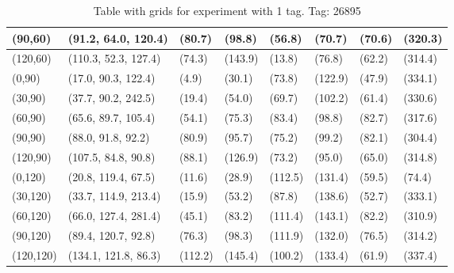 \begin{table}[H]
\begin{tabular}{|l|l|l|l|l|l|l|l|}
    (90,60) 	& (91.2, 64.0, 120.4) 	 & (80.7) 	& (98.8)	& (56.8)	 & (70.7) 	 & (70.6)	 & (320.3)	\\ \hline
    (120,60) 	& (110.3, 52.3, 127.4) 	 & (74.3) 	& (143.9)	& (13.8)	 & (76.8) 	 & (62.2)	 & (314.4)	\\ \hline
    (0,90) 	& (17.0, 90.3, 122.4) 	 & (4.9) 	& (30.1)	& (73.8)	 & (122.9) 	 & (47.9)	 & (334.1)	\\ \hline
    (30,90) 	& (37.7, 90.2, 242.5) 	 & (19.4) 	& (54.0)	& (69.7)	 & (102.2) 	 & (61.4)	 & (330.6)	\\ \hline
    (60,90) 	& (65.6, 89.7, 105.4) 	 & (54.1) 	& (75.3)	& (83.4)	 & (98.8) 	 & (82.7)	 & (317.6)	\\ \hline
    (90,90) 	& (88.0, 91.8, 92.2) 	 & (80.9) 	& (95.7)	& (75.2)	 & (99.2) 	 & (82.1)	 & (304.4)	\\ \hline
    (120,90) 	& (107.5, 84.8, 90.8) 	 & (88.1) 	& (126.9)	& (73.2)	 & (95.0) 	 & (65.0)	 & (314.8)	\\ \hline
    (0,120) 	& (20.8, 119.4, 67.5) 	 & (11.6) 	& (28.9)	& (112.5)	 & (131.4) 	 & (59.5)	 & (74.4)	\\ \hline
    (30,120) 	& (33.7, 114.9, 213.4) 	 & (15.9) 	& (53.2)	& (87.8)	 & (138.6) 	 & (52.7)	 & (333.1)	\\ \hline
    (60,120) 	& (66.0, 127.4, 281.4) 	 & (45.1) 	& (83.2)	& (111.4)	 & (143.1) 	 & (82.2)	 & (310.9)	\\ \hline
    (90,120) 	& (89.4, 120.7, 92.8) 	 & (76.3) 	& (98.3)	& (111.9)	 & (132.0) 	 & (76.5)	 & (314.2)	\\ \hline
    (120,120) 	& (134.1, 121.8, 86.3) 	 & (112.2) 	& (145.4)	& (100.2)	 & (133.4) 	 & (61.9)	 & (337.4)	\\ \hline
    \end{tabular}
\label{Tab:one-tag-experiment-result}
\caption{Table with grids for experiment with 1 tag. Tag: 26895}
\end{table}

